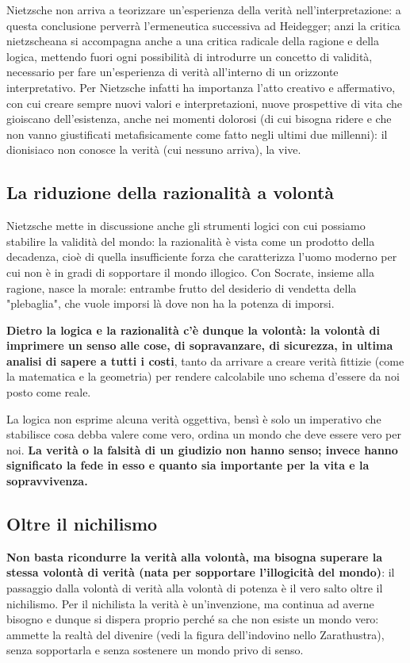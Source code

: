 Nietzsche non arriva a teorizzare un'esperienza della verità nell'interpretazione: a questa conclusione perverrà l'ermeneutica successiva ad Heidegger; anzi la critica nietzscheana si accompagna anche a una critica radicale della ragione e della logica, mettendo fuori ogni possibilità di introdurre un concetto di validità, necessario per fare un'esperienza di verità all'interno di un orizzonte interpretativo. Per Nietzsche infatti ha importanza l'atto creativo e affermativo, con cui creare sempre nuovi valori e interpretazioni, nuove prospettive di vita che gioiscano  dell'esistenza, anche nei momenti dolorosi (di cui bisogna ridere e che non vanno giustificati metafisicamente come fatto negli ultimi due millenni): il dionisiaco non conosce la verità (cui nessuno arriva), la vive.

\subsection{La riduzione della razionalità a volontà}

Nietzsche mette in discussione anche gli strumenti logici con cui possiamo stabilire la validità del mondo: la razionalità è vista come un prodotto della decadenza, cioè di quella insufficiente forza che caratterizza l'uomo moderno per cui non è in gradi di sopportare il mondo illogico.
Con Socrate, insieme alla ragione, nasce la morale: entrambe frutto del desiderio di vendetta della "plebaglia", che vuole imporsi là dove non ha la potenza di imporsi.

\textbf{Dietro la logica e la razionalità c'è dunque la volontà: la volontà di imprimere un senso alle cose, di sopravanzare, di sicurezza, in ultima analisi di sapere a tutti i costi}, tanto da arrivare a creare verità fittizie (come la matematica e la geometria) per rendere calcolabile uno schema d'essere da noi posto come reale.

La logica non esprime alcuna verità oggettiva, bensì è solo un imperativo che stabilisce cosa debba valere come vero, ordina un mondo che deve essere vero per noi. \textbf{La verità o la falsità di un giudizio non hanno senso; invece hanno significato la fede in esso e quanto sia importante per la vita e la sopravvivenza.}

\subsection{Oltre il nichilismo}

\textbf{Non basta ricondurre la verità alla volontà, ma bisogna superare la stessa volontà di verità (nata per sopportare l'illogicità del mondo)}: il passaggio dalla volontà di verità alla volontà di potenza è il vero salto oltre il nichilismo. Per il nichilista la verità è un'invenzione, ma continua ad averne bisogno e dunque si dispera proprio perché sa che non esiste un mondo vero: ammette la realtà del divenire (vedi la figura dell'indovino nello Zarathustra), senza sopportarla e senza sostenere un mondo privo di senso.


